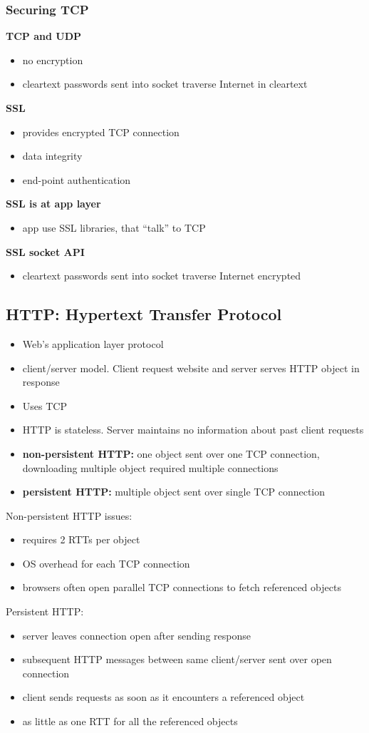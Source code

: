 \subsubsection{Securing TCP}
\textbf{TCP and UDP}
\begin{itemize}
	\item no encryption
	\item cleartext passwords sent into socket traverse Internet in cleartext
\end{itemize}
\textbf{SSL}
\begin{itemize}
	\item provides encrypted TCP connection
	\item data integrity
	\item end-point authentication
\end{itemize}
\textbf{SSL is at app layer}
\begin{itemize}
	\item app use SSL libraries, that ``talk'' to TCP
\end{itemize}
\textbf{SSL socket API}
\begin{itemize}
	\item cleartext passwords sent into socket traverse Internet encrypted
\end{itemize}

\subsection{HTTP: Hypertext Transfer Protocol}\label{sec:http}
\begin{itemize}
	\item Web's application layer protocol
	\item client/server model. Client request website and server serves HTTP object in response
	\item Uses TCP
	\item HTTP is stateless. Server maintains no information about past client requests
	\item \textbf{non-persistent HTTP:} one object sent over one TCP connection, downloading multiple object required multiple connections
	\item \textbf{persistent HTTP:} multiple object sent over single TCP connection
\end{itemize}
Non-persistent HTTP issues:
\begin{itemize}
	\item requires 2 RTTs per object
	\item OS overhead for each TCP connection
	\item browsers often open parallel TCP connections to fetch referenced objects
\end{itemize}
Persistent HTTP:
\begin{itemize}
	\item server leaves connection open after sending response
	\item subsequent HTTP messages between same client/server sent over open connection
	\item client sends requests as soon as it encounters a referenced object
	\item as little as one RTT for all the referenced objects
\end{itemize}
